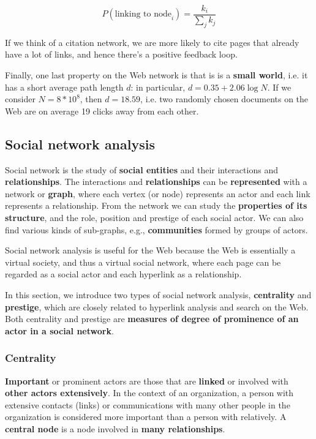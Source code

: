 $$
P(\text{linking to node}_i) = \frac{k_i}{\sum_j k_j}
$$

If we think of a citation network, we are more likely to cite pages that already have a lot of links, and hence there's a positive feedback loop.

Finally, one last property on the Web network is that is is a \textbf{small world}, i.e. it has a short average path length $d$: in particular, $d = 0.35 + 2.06 \log N$. If we consider $N = 8 * 10^8$, then $d = 18.59$, i.e. two randomly chosen documents on the Web are on average 19 clicks away from each other.

\subsection{Social network analysis}
Social network is the study of \textbf{social entities} and their interactions and \textbf{relationships}. The interactions and \textbf{relationships} can be \textbf{represented} with a network or \textbf{graph}, where each vertex (or node) represents an actor and each link represents a relationship. From the network we can study the \textbf{properties of its structure}, and the role, position and prestige of each social actor. We can also find various kinds of sub-graphs, e.g., \textbf{communities} formed by groups of actors. 

Social network analysis is useful for the Web because the Web is essentially a virtual society, and thus a virtual social network, where each page can be regarded as a social actor and each hyperlink as a relationship.

In this section, we introduce two types of social network analysis, \textbf{centrality} and \textbf{prestige}, which are closely related to hyperlink analysis and search on the Web. Both centrality and prestige are \textbf{measures of degree of prominence of an actor in a social network}. 

\subsubsection{Centrality}
\textbf{Important} or prominent actors are those that are \textbf{linked} or involved with \textbf{other actors extensively}. In the context of an organization, a person with extensive contacts (links) or communications with many other people in the organization is considered more important than a person with relatively. A \textbf{central node} is a node involved in \textbf{many relationships}.

